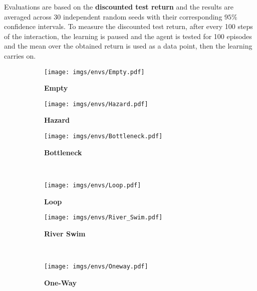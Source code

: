 Evaluations are based on the \textbf{discounted test return} and the results are averaged across 30 independent random seeds with their corresponding $95\%$ confidence intervals. To measure the discounted test return, after every 100 steps of the interaction, the learning is paused and the agent is tested for 100 episodes and the mean over the obtained return is used as a data point, then the learning carries on.
%
%
%
\begin{figure}[tbh]
        \centering
        \begin{subfigure}[b]{0.32\linewidth}
            \centering
            \caption*{\textbf{Empty}}
            \texttt{[image: imgs/envs/Empty.pdf]}
        \end{subfigure}
        \hfill
        \begin{subfigure}[b]{0.32\linewidth}
            \centering
            \caption*{\textbf{Hazard}}
            \texttt{[image: imgs/envs/Hazard.pdf]}
        \end{subfigure}
        \hfill
        \begin{subfigure}[b]{0.32\linewidth}
            \centering
            \caption*{\textbf{Bottleneck}}
            \texttt{[image: imgs/envs/Bottleneck.pdf]}
        \end{subfigure}
        \\[5pt]
        \begin{subfigure}[b]{0.32\linewidth}
            \centering
            \caption*{\textbf{Loop}}
            \texttt{[image: imgs/envs/Loop.pdf]}
        \end{subfigure}
        \hfill
        \begin{minipage}[b]{0.32\linewidth}
        \begin{subfigure}[b]{\linewidth}
                \centering
                \caption*{\textbf{River Swim}}
                \texttt{[image: imgs/envs/River\_Swim.pdf]}
            \end{subfigure}
        \\
        \begin{subfigure}[b]{\linewidth}
            \centering
            \caption*{\textbf{One-Way}}
            \texttt{[image: imgs/envs/Oneway.pdf]}
        \end{subfigure}
        \end{minipage}
        \hfill
        \begin{minipage}[b]{0.32\linewidth}
        \begin{subfigure}[b]{\linewidth}

\end{subfigure}
\end{minipage}
\end{figure}
